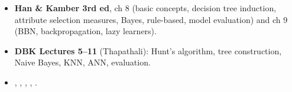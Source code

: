 \begin{itemize}
  \item \textbf{Han \& Kamber 3rd ed}, ch 8 (basic concepts, decision tree induction, attribute
        selection measures, Bayes, rule-based, model evaluation) and ch 9 (BBN, backpropagation,
        lazy learners). 
  \item \textbf{DBK Lectures 5--11} (Thapathali): Hunt's algorithm, tree construction, Naive Bayes,
        KNN, ANN, evaluation.
  \item {}, ,
        , , .
\end{itemize}
